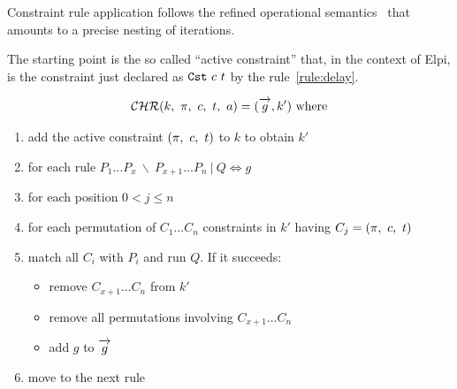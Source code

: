 \documentclass[a4paper, 11pt]{book}
\begin{document}
Constraint rule application follows the refined operational
semantics~\cite{10.1007/978-3-540-27775-0_7} that amounts to a precise nesting of iterations.

The starting point is the so called ``active constraint'' that, in the context of Elpi, is
the constraint just declared as $\texttt{Cst}\ c\ t$ by the rule~\ref{rule:delay}.

$$
\mathcal{CHR}(k,\ \prog,\ c,\ t,\ \alts) = (\vecL{g}, k')\ \mathrm{where}
$$
\begin{enumerate}
\item add the active constraint $(\prog,\ c,\ t)$ to $k$ to obtain $k'$
\item for each rule $P_1 \ldots P_x\ \backslash\ P_{x+1} \ldots P_n\ |\ Q \Leftrightarrow g$
\item for each position $0 < j \leq n$
\item for each permutation of $C_1 \ldots C_n$ constraints in $k'$ having $C_j = ({\pi},\ c,\ t)$
\item match all $C_i$ with $P_i$ and run $Q$. If it succeeds:
  \begin{itemize}
    \item remove $C_{x+1} \ldots C_n$ from $k'$
    \item remove all permutations involving $C_{x+1} \ldots C_n$
    \item add $g$ to $\vecL{g}$
  \end{itemize}
\item move to the next rule
\end{enumerate}
\end{document}
